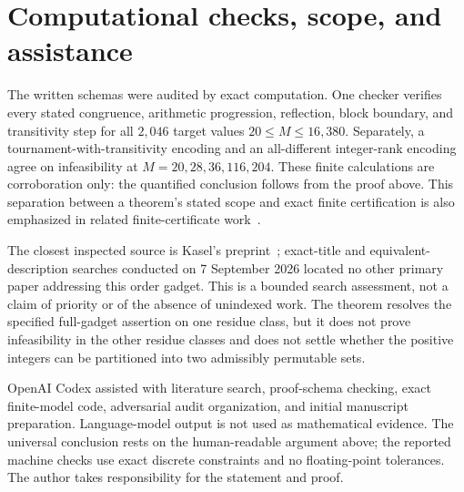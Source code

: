 \documentclass[11pt]{article}
\begin{document}
\section{Computational checks, scope, and assistance}

The written schemas were audited by exact computation.  One checker verifies
every stated congruence, arithmetic progression, reflection, block boundary,
and transitivity step for all $2{,}046$ target values
$20\leq M\leq16{,}380$.  Separately, a tournament-with-transitivity encoding
and an all-different integer-rank encoding agree on infeasibility at
$M=20,28,36,116,204$.  These finite calculations are corroboration only:
the quantified conclusion follows from the proof above.  This separation
between a theorem's stated scope and exact finite certification is also
emphasized in related finite-certificate work~\cite{ZengEtAl2026}.

The closest inspected source is Kasel's preprint~\cite{Kasel2026}; exact-title
and equivalent-description searches conducted on 7 September 2026 located no
other primary paper addressing this order gadget.  This is a bounded search
assessment, not a claim of priority or of the absence of unindexed work.
The theorem resolves the specified full-gadget assertion on one residue class,
but it does not prove infeasibility in the other residue classes and does not
settle whether the positive integers can be partitioned into two admissibly
permutable sets.

OpenAI Codex assisted with literature search, proof-schema checking, exact
finite-model code, adversarial audit organization, and initial manuscript
preparation.  Language-model output is not used as mathematical evidence.
The universal conclusion rests on the human-readable argument above; the
reported machine checks use exact discrete constraints and no floating-point
tolerances.  The author takes responsibility for the statement and proof.



\end{document}
